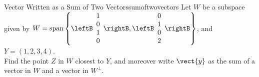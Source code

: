 \begin{example}{Vector Written as a Sum of Two Vectors}{sumoftwovectors}
Let $W$ be a subspace given by $W = \mbox{span} \left\{
\leftB
\begin{array}{c}
1 \\
0 \\
1 \\
0 \\
\end{array}
\rightB, 
\leftB 
\begin{array}{c}
0 \\
1 \\
0 \\
2 \\
\end{array}
\rightB
\right\}$, and $Y = (1,2,3,4)$. \\
Find the point $Z$ in $W$ closest to $Y$, and moreover write $\vect{y}$ as the sum of a  vector in $W$ and a vector in $W^{\perp}$. 
\end{example}

